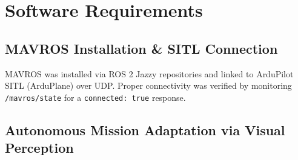 \documentclass[11pt,a4paper]{article}
\begin{document}
\section{Software Requirements}

\subsection{MAVROS Installation \& SITL Connection}
MAVROS was installed via ROS 2 Jazzy repositories and linked to ArduPilot SITL (ArduPlane) over UDP. Proper connectivity was verified by monitoring \texttt{/mavros/state} for a \texttt{connected: true} response.

\subsection{Autonomous Mission Adaptation via Visual Perception}
\end{document}
